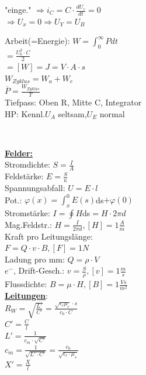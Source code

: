 \documentclass[8pt]{extarticle}
\begin{document}
\begin{minipage}{0.33\textwidth}
"einge." $\Rightarrow i_C = C \cdot \frac{dU_c}{dt} = 0$\\
\phantom{sss} $\Rightarrow U_x = 0 \Rightarrow U_Y = U_B$

Arbeit(=Energie): $W = \int_0^\infty P dt$\\
\phantom{sssssssss} $= \frac{U_b^2 \cdot C}{2} $\\
\phantom{sssssssss} $= [W] = J = V \cdot A \cdot s$\\
$W_{Zyklus} = W_a + W_e$\\
$\overline{P} = \frac{W_{Zyklus}}{T}$\\
Tiefpass: Oben R, Mitte C, Integrator\\
HP: Kennl.$U_A$ seltsam,$U_E$ normal
\end{minipage}%
~~~~~~~
\begin{minipage}{0.33\textwidth}

\underline{\textbf{Felder:}}\\
Stromdichte: $S=\frac{I}{A}$\\
Feldstärke: $E=\frac{S}{\kappa}$\\
Spannungsabfall: $U=E \cdot l$\\
Pot.: $\varphi (x)= \int_x^0 E(s)$ds$ + \varphi(0)$\\
Stromstärke: $I = \oint H $ds$ = H \cdot 2\pi d$\\
Mag.Feldstr.: $H = \frac{I}{2\pi d}, [H] = 1\frac{A}{m}$\\
Kraft pro Leitungslänge:\\
\phantom{ss} $F=Q \cdot v \cdot B, [F] = 1N$\\
Ladung pro mm: $Q = \rho \cdot V$\\
$e^-$, Drift-Gesch.: $v = \frac{S}{\rho}, [v] = 1\frac{m}{s}$\\
Flussdichte: $B=\mu \cdot H, [B] = 1 \frac{Vs}{m^2}$\\
 
\underline{\textbf{Leitungen}}:\\
$R_W = \sqrt{\frac{L'}{C'}} = \frac{\sqrt{\epsilon_r \mu_r} \cdot s}{c_0 \cdot C}$ \\
$C' = \frac{C}{l}$\\
$L' = \frac{1}{c_m \cdot \sqrt{C'}}$\\
$c_m= \frac{1}{\sqrt{L' \cdot C'}} = \frac{c_0}{\sqrt{\epsilon_r \cdot \mu_s}}$\\
$X' = \frac{X}{l}$\\


\end{minipage}
\end{document}

